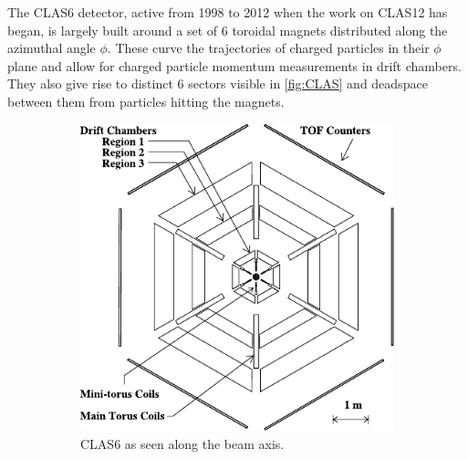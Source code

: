 \documentclass[a4paper,12pt]{article}
\begin{document}
The CLAS6 detector, active from 1998 to 2012 when the work on CLAS12 has began, is largely built around a set of 6 toroidal magnets distributed along the azimuthal angle $\phi$.
These curve the trajectories of charged particles in their $\phi$ plane and allow for charged particle momentum measurements in drift chambers.
They also give rise to distinct 6 sectors visible in \cref{fig:CLAS} and deadspace between them from particles hitting the magnets.

\begin{figure}[H]
    \centering
    \begin{subfigure}[b]{0.45\textwidth}
        \centering
        \includegraphics[width=\textwidth]{figures/CLAS_headon.pdf}
        \caption{CLAS6 as seen along the beam axis.}
    \end{subfigure}
    \hfill
    \begin{subfigure}[b]{0.5\textwidth}
        \centering

\end{subfigure}
\end{figure}
\end{document}
